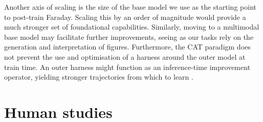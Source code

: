 \documentclass[garamond,a4paper]{inherent}
\begin{document}
Another axis of scaling is the size of the base model we use as the starting point to post-train Faraday.
Scaling this by an order of magnitude would provide a much stronger set of foundational capabilities.
Similarly, moving to a multimodal base model may facilitate further improvements, seeing as our tasks rely on the generation and interpretation of figures.
Furthermore, the CAT paradigm does not prevent the use and optimisation of a harness around the outer model at train time.
An outer harness might function as an inference-time improvement operator, yielding stronger trajectories from which to learn \citep{silver2016mastering, anthony2017thinking, evotune}. 

\FloatBarrier
\newpage
\section{Human studies}
\label{app:human-studies}
\end{document}

